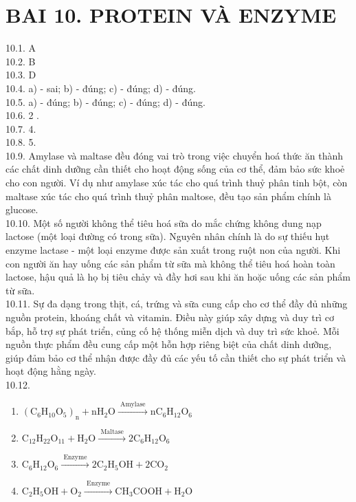 \documentclass[10pt]{article}
\begin{document}
\section*{BAI 10. PROTEIN VÀ ENZYME}
10.1. A\\
10.2. B\\
10.3. D\\
10.4. a) - sai; b) - đúng; c) - đúng; d) - đúng.\\
10.5. a) - đúng; b) - đúng; c) - đúng; d) - đúng.\\
10.6. 2 .\\
10.7. 4.\\
10.8. 5.\\
10.9. Amylase và maltase đều đóng vai trò trong việc chuyển hoá thức ăn thành các chất dinh dưỡng cần thiết cho hoạt động sống của cơ thể, đảm bảo sức khoẻ cho con người. Ví dụ như amylase xúc tác cho quá trình thuỷ phân tinh bột, còn maltase xúc tác cho quá trình thuỷ phân maltose, đều tạo sản phẩm chính là glucose.\\
10.10. Một số người không thể tiêu hoá sữa do mắc chứng không dung nạp lactose (một loại đường có trong sữa). Nguyên nhân chính là do sự thiếu hụt enzyme lactase - một loại enzyme được sản xuất trong ruột non của người. Khi con người ăn hay uống các sản phẩm từ sữa mà không thể tiêu hoá hoàn toàn lactose, hậu quả là họ bị tiêu chảy và đầy hơi sau khi ăn hoặc uống các sản phẩm từ sữa.\\
10.11. Sự đa dạng trong thịt, cá, trứng và sữa cung cấp cho cơ thể đầy đủ những nguồn protein, khoáng chất và vitamin. Điều này giúp xây dựng và duy trì cơ bắp, hỗ trợ sự phát triển, củng cố hệ thống miễn dịch và duy trì sức khoẻ. Mỗi nguồn thực phẩm đều cung cấp một hỗn hợp riêng biệt của chất dinh dưỡng, giúp đảm bảo cơ thể nhận được đầy đủ các yếu tố cần thiết cho sự phát triển và hoạt động hằng ngày.\\
10.12.

\begin{enumerate}
  \item $\left(\mathrm{C}_{6} \mathrm{H}_{10} \mathrm{O}_{5}\right)_{\mathrm{n}}+\mathrm{nH}_{2} \mathrm{O} \xrightarrow{\text { Amylase }} \mathrm{nC}_{6} \mathrm{H}_{12} \mathrm{O}_{6}$
  \item $\mathrm{C}_{12} \mathrm{H}_{22} \mathrm{O}_{11}+\mathrm{H}_{2} \mathrm{O} \xrightarrow{\text { Maltase }} 2 \mathrm{C}_{6} \mathrm{H}_{12} \mathrm{O}_{6}$
  \item $\mathrm{C}_{6} \mathrm{H}_{12} \mathrm{O}_{6} \xrightarrow{\text { Enzyme }} 2 \mathrm{C}_{2} \mathrm{H}_{5} \mathrm{OH}+2 \mathrm{CO}_{2}$
  \item $\mathrm{C}_{2} \mathrm{H}_{5} \mathrm{OH}+\mathrm{O}_{2} \xrightarrow{\text { Enzyme }} \mathrm{CH}_{3} \mathrm{COOH}+\mathrm{H}_{2} \mathrm{O}$
\end{enumerate}
\end{document}

